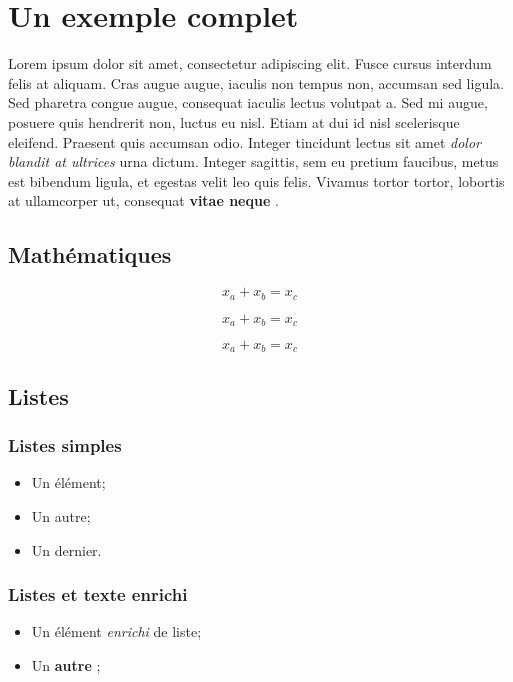 \documentclass[a4paper,11pt]{report}
\begin{document}
 \section{Un exemple complet} 

Lorem ipsum dolor sit amet, consectetur adipiscing elit. Fusce cursus interdum felis at aliquam. Cras augue augue, iaculis non tempus non, accumsan sed ligula. Sed pharetra congue augue, consequat iaculis lectus volutpat a. Sed mi augue, posuere quis hendrerit non, luctus eu nisl. Etiam at dui id nisl scelerisque eleifend. Praesent quis accumsan odio. Integer tincidunt lectus sit amet \emph{dolor blandit at ultrices} urna dictum. Integer sagittis, sem eu pretium faucibus, metus est bibendum ligula, et egestas velit leo quis felis. Vivamus tortor tortor, lobortis at ullamcorper ut, consequat \textbf{vitae neque} .

 \subsection{Mathématiques} 

$$
x_a + x_b = x_c
$$

\[
x_a + x_b = x_c
\]

\begin{equation}
x_a + x_b = x_c
\end{equation}

 \subsection{Listes} 

 \subsubsection{Listes simples} 

\begin{itemize}
\item Un élément;
\item Un autre;
\item Un dernier.
\end{itemize}


 \subsubsection{Listes et texte enrichi} 

\begin{itemize}
\item Un élément \emph{enrichi} de liste;
\item Un \textbf{autre} ;
\end{itemize}
\end{document}
